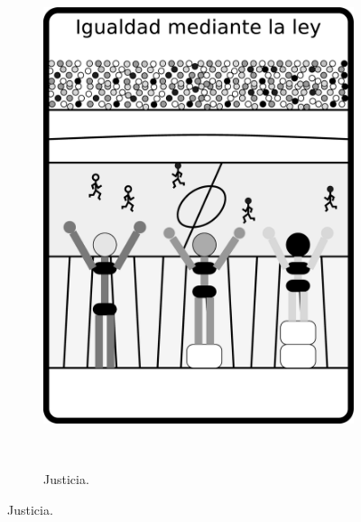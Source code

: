 \begin{figure}[ht!]
\begin{subfigure}{0.3\textwidth}
        \includegraphics[width=\textwidth]{caps/desigualdad/equidad.eps}
        \label{fig:equidad}
    \end{subfigure}
    ~ %
    \begin{subfigure}{0.3\textwidth}
        \caption{Justicia.}

\end{subfigure}
\end{figure}
